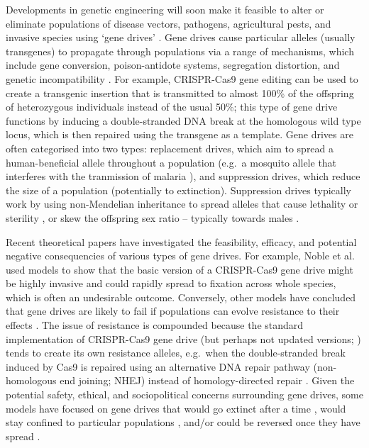 \documentclass[]{rsos}%
\begin{document}
Developments in genetic engineering will soon make it feasible to alter
or eliminate populations of disease vectors, pathogens, agricultural
pests, and invasive species using `gene drives'
\citep{gantz2015hi, hammond2016cr, wang2016cr, prowse2017do, kyrou2018cr, noble2018cu}.
Gene drives cause particular alleles (usually transgenes) to propagate
through populations via a range of mechanisms, which include gene
conversion, poison-antidote systems, segregation distortion, and genetic
incompatibility \citep{lindholm2016ec, champer2016ch, oberhofer2019cl}.
For example, CRISPR-Cas9 gene editing can be used to create a transgenic
insertion that is transmitted to almost 100\% of the offspring of
heterozygous individuals instead of the usual 50\%; this type of gene
drive functions by inducing a double-stranded DNA break at the
homologous wild type locus, which is then repaired using the transgene
as a template. Gene drives are often categorised into two types:
replacement drives, which aim to spread a human-beneficial allele
throughout a population (e.g.~a mosquito allele that interferes with the
tranmission of malaria \citep{gantz2015hi, marshall2015gene}), and
suppression drives, which reduce the size of a population (potentially
to extinction). Suppression drives typically work by using non-Mendelian
inheritance to spread alleles that cause lethality or sterility
\citep{hammond2016cr, kyrou2018cr, maselko2018ge}, or skew the offspring
sex ratio -- typically towards males
\citep{windbichler2008ta, galizi2014sy, beaghton2017ve, burt2018se, papathanos2018re}.

Recent theoretical papers have investigated the feasibility, efficacy,
and potential negative consequencies of various types of gene drives.
For example, Noble et al. \citep{noble2018cu} used models to show that
the basic version of a CRISPR-Cas9 gene drive might be highly invasive
and could rapidly spread to fixation across whole species, which is
often an undesirable outcome. Conversely, other models have concluded
that gene drives are likely to fail if populations can evolve resistance
to their effects \citep{drury2017cr, unckless2017ev}. The issue of
resistance is compounded because the standard implementation of
CRISPR-Cas9 gene drive (but perhaps not updated versions;
\citep{esvelt2014em, unckless2017ev, prowse2017do, kyrou2018cr}) tends
to create its own resistance alleles, e.g.~when the double-stranded
break induced by Cas9 is repaired using an alternative DNA repair
pathway (non-homologous end joining; NHEJ) instead of homology-directed
repair
\citep{gantz2015mu, gantz2015hi, hammond2016cr, wang2016cr, unckless2017ev}.
Given the potential safety, ethical, and sociopolitical concerns
surrounding gene drives, some models have focused on gene drives that
would go extinct after a time
\citep{min2017da, burt2018se, noble2019da}, would stay confined to
particular populations \citep{maselko2018ge, noble2019da}, and/or could
be reversed once they have spread \citep{vella2017ev}.
\end{document}
